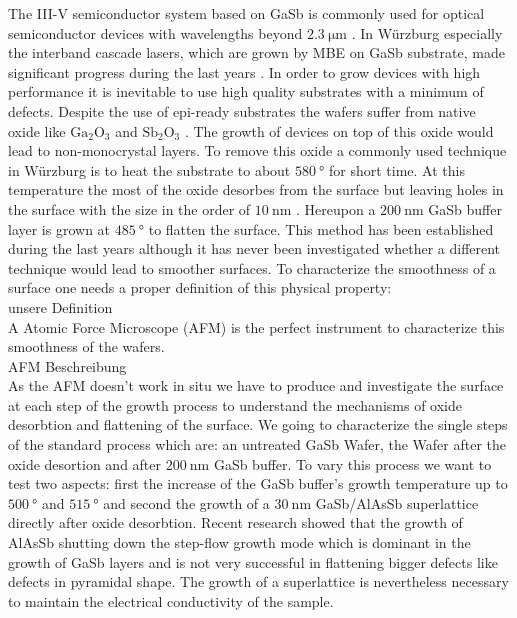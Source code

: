 The III-V semiconductor system based on GaSb is commonly used for optical semiconductor devices with wavelengths beyond $\SI{2.3}{\micro\meter}$ \cite{arafin}. In Würzburg especially the interband cascade lasers, which are grown by MBE on GaSb substrate, made significant progress during the last years \cite{weih}. In order to grow devices with high performance it is inevitable to use high quality substrates with a minimum of defects. Despite the use of epi-ready substrates the wafers suffer from native oxide like $\mathrm{Ga}_2 \mathrm{O}_3$ and $\mathrm{Sb}_2 \mathrm{O}_3$ \cite{vineis}. The growth of devices on top of this oxide would lead to non-monocrystal layers. To remove this oxide a commonly used technique in Würzburg is to heat the substrate to about $\SI{580}{\degree}$ for short time. At this temperature the most of the oxide desorbes from the surface  but leaving holes in the surface with the size in the order of  $\SI{10}{\nano\meter}$ \cite{murray}. Hereupon a $\SI{200}{\nano\meter}$ GaSb buffer layer is grown at $\SI{485}{\degree}$ to flatten the surface. This method has been established during the last years although it has never been investigated whether a different technique would lead to smoother surfaces. 
To characterize the smoothness of a surface one needs a proper definition of this physical property:\\
	unsere Definition\\
A Atomic Force Microscope (AFM) is the perfect instrument to characterize this smoothness of the wafers. \\
	AFM Beschreibung\\
As the AFM doesn't work in situ we have to produce and investigate the surface at each step of the growth process to understand the mechanisms of oxide desorbtion and flattening of the surface. We going to characterize the single steps of the standard process which are: an untreated GaSb Wafer, the Wafer after the oxide desortion and after $\SI{200}{\nano\meter}$ GaSb buffer. To vary this process we want to test two aspects: first the increase of the GaSb buffer's growth temperature up to $\SI{500}{\degree}$ and $\SI{515}{\degree}$ and second the growth of a $\SI{30}{\nano\meter}$ GaSb/AlAsSb superlattice directly after oxide desorbtion. Recent research showed that the growth of AlAsSb shutting down the step-flow growth mode which is dominant in the growth of GaSb layers and is not very successful in flattening bigger defects like defects in pyramidal shape. The growth of a superlattice is nevertheless necessary to maintain the electrical conductivity of the sample.\\
